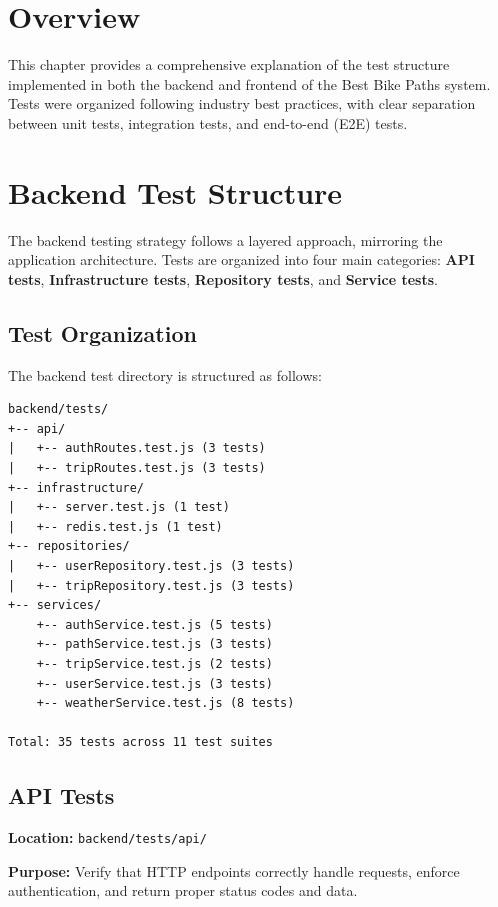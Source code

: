 \section{Overview}
\label{sec:testing_overview}

This chapter provides a comprehensive explanation of the test structure implemented in both the backend and frontend of the Best Bike Paths system. Tests were organized following industry best practices, with clear separation between unit tests, integration tests, and end-to-end (E2E) tests.

\section{Backend Test Structure}
\label{sec:backend_test_structure}

The backend testing strategy follows a layered approach, mirroring the application architecture. Tests are organized into four main categories: \textbf{API tests}, \textbf{Infrastructure tests}, \textbf{Repository tests}, and \textbf{Service tests}.

\subsection{Test Organization}
\label{subsec:backend_test_organization}

The backend test directory is structured as follows:

\begin{verbatim}
backend/tests/
+-- api/
|   +-- authRoutes.test.js (3 tests)
|   +-- tripRoutes.test.js (3 tests)
+-- infrastructure/
|   +-- server.test.js (1 test)
|   +-- redis.test.js (1 test)
+-- repositories/
|   +-- userRepository.test.js (3 tests)
|   +-- tripRepository.test.js (3 tests)
+-- services/
    +-- authService.test.js (5 tests)     
    +-- pathService.test.js (3 tests)
    +-- tripService.test.js (2 tests)
    +-- userService.test.js (3 tests)
    +-- weatherService.test.js (8 tests)

Total: 35 tests across 11 test suites
\end{verbatim}

\subsection{API Tests}
\label{subsec:api_tests}

\textbf{Location:} \texttt{backend/tests/api/}

\textbf{Purpose:} Verify that HTTP endpoints correctly handle requests, enforce authentication, and return proper status codes and data.


